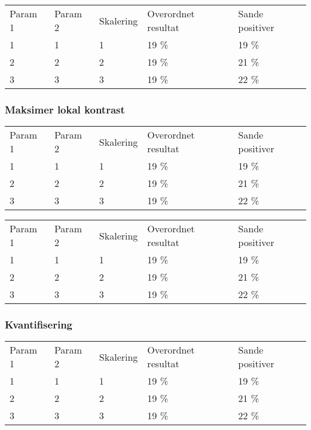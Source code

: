 \begin{tabular}{|l|l|l|l|l|}
\hline
\rowcolor[gray]{0.9} \multicolumn{5}{|>{\columncolor[gray]{0.9}}c|}{\textbf{Kontrolsæt}} \\ \hline
Param 1 & Param 2 & Skalering & Overordnet resultat & Sande positiver\\ \hline
1 & 1 & 1 & 19 \% & 19 \%\\ \hline
2 & 2 & 2 & 19 \% & 21 \% \\ \hline
3 & 3 & 3 & 19 \% & 22 \% \\
\hline
\end{tabular}

\subsubsection*{Maksimer lokal kontrast}

\begin{tabular}{|l|l|l|l|l|}
\hline
\rowcolor[gray]{0.9} \multicolumn{5}{|>{\columncolor[gray]{0.9}}c|}{\textbf{Træningssæt}} \\ \hline
Param 1 & Param 2 & Skalering & Overordnet resultat & Sande positiver\\ \hline
1 & 1 & 1 & 19 \% & 19 \%\\ \hline
2 & 2 & 2 & 19 \% & 21 \% \\ \hline
3 & 3 & 3 & 19 \% & 22 \% \\
\hline
\end{tabular}

\begin{tabular}{|l|l|l|l|l|}
\hline
\rowcolor[gray]{0.9} \multicolumn{5}{|>{\columncolor[gray]{0.9}}c|}{\textbf{Kontrolsæt}} \\ \hline
Param 1 & Param 2 & Skalering & Overordnet resultat & Sande positiver\\ \hline
1 & 1 & 1 & 19 \% & 19 \%\\ \hline
2 & 2 & 2 & 19 \% & 21 \% \\ \hline
3 & 3 & 3 & 19 \% & 22 \% \\
\hline
\end{tabular}

\subsubsection*{Kvantifisering}

\begin{tabular}{|l|l|l|l|l|}
\hline
\rowcolor[gray]{0.9} \multicolumn{5}{|>{\columncolor[gray]{0.9}}c|}{\textbf{Træningssæt}} \\ \hline
Param 1 & Param 2 & Skalering & Overordnet resultat & Sande positiver\\ \hline
1 & 1 & 1 & 19 \% & 19 \%\\ \hline
2 & 2 & 2 & 19 \% & 21 \% \\ \hline
3 & 3 & 3 & 19 \% & 22 \% \\
\hline
\end{tabular}

